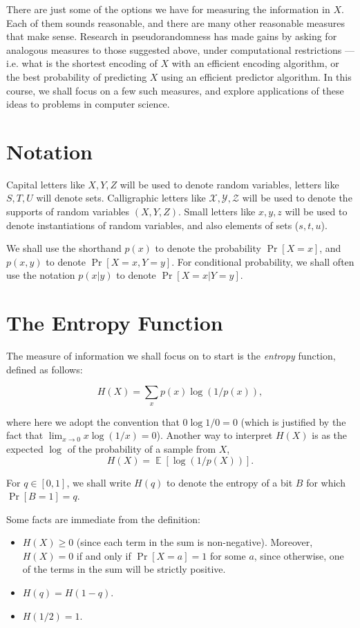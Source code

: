 \documentclass[10pt]{article}
\newcommand{\Expect}[1]{\mathop{\mathbb{E}}\left
[ #1 \right ]}
\begin{document}
There are just some of the options we have for measuring the information in $X$. Each of them sounds reasonable, and there are many other reasonable measures that make sense. Research in pseudorandomness has made gains by asking for analogous measures to those suggested above, under computational restrictions --- i.e. what is the shortest encoding of $X$ with an efficient encoding algorithm, or the best probability of predicting $X$ using an efficient predictor algorithm. In this course, we shall focus on a few such measures, and explore applications of these ideas to problems in computer science. 

\section{Notation}
Capital letters like $X,Y,Z$ will be used to denote random variables, letters like $S,T,U$ will denote sets. Calligraphic letters like $\mathcal{X,Y,Z}$ will be used to denote the supports of random variables $(X,Y,Z)$. Small letters like $x,y,z$ will be used to denote instantiations of random variables, and also elements of sets ($s,t,u$).

We shall use the shorthand $p(x)$ to denote the probability $\Pr[X=x]$, and $p(x,y)$ to denote $\Pr[X=x,Y=y]$. For conditional probability, we shall often use the notation $p(x|y)$ to denote $\Pr[X=x|Y=y]$.

\section{The Entropy Function}
The measure of information we shall focus on to start is the \emph{entropy} function, defined as follows:

\[H(X) = \sum_{x} p(x) \log(1/p(x)), \]

where here we adopt the convention that $0 \log 1/0 = 0$ (which is justified by the fact that $\lim_{x \to 0} x \log(1/x) = 0$). Another way to interpret $H(X)$ is as the expected $\log$ of the probability of a sample from $X$, \[H(X) = \Expect{\log(1/p(X))}.\]

For $q \in [0,1]$, we shall write $H(q)$ to denote the entropy of a bit $B$ for which $\Pr[B=1] = q$. 

Some facts are immediate from the definition:

\begin{itemize}
	\item $H(X) \geq 0$ (since each term in the sum is non-negative). Moreover, $H(X)=0$ if and only if $\Pr[X=a]=1$ for some $a$, since otherwise, one of the terms in the sum will be strictly positive.
	\item $H(q) = H(1-q)$.
    \item $H(1/2) = 1$.
\end{itemize}
\end{document}
